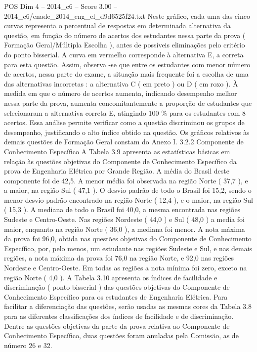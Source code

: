 \begin{textsample}{POS Dim 4 – 2014\_c6 – Score 3.00 – 2014\_c6/enade\_2014\_eng\_el\_d9d6525f24.txt}
Neste gráfico, cada uma das cinco curvas representa o percentual de respostas em determinada alternativa da questão, em função do número de acertos dos estudantes nessa parte da prova ( Formação Geral/Múltipla Escolha ), antes de possíveis eliminações pelo critério do ponto bisserial.
A curva em vermelho corresponde à alternativa E, a correta para esta questão.
Assim, observa -se que entre os estudantes com menor número de acertos, nessa parte do exame, a situação mais frequente foi a escolha de uma das alternativas incorretas : a alternativa C ( em preto ) ou D ( em roxo ).
À medida em que o número de acertos aumenta, indicando desempenho melhor nessa parte da prova, aumenta concomitantemente a proporção de estudantes que selecionaram a alternativa correta E, atingindo 100 \% para os estudantes com 8 acertos.
Essa análise permite verificar como a questão discriminou os grupos de desempenho, justificando o alto índice obtido na questão.
Os gráficos relativos às demais questões de Formação Geral constam do Anexo I. 3.2.2 Componente de Conhecimento Específico A Tabela 3.9 apresenta as estatísticas básicas em relação às questões objetivas do Componente de Conhecimento Específico da prova de Engenharia Elétrica por Grande Região.
A média do Brasil deste componente foi de 42,5.
A menor média foi observada na região Norte ( 37,7 ), e a maior, na região Sul ( 47,1 ).
O desvio padrão de todo o Brasil foi 15,2, sendo o menor desvio padrão encontrado na região Norte ( 12,4 ), e o maior, na região Sul ( 15,3 ).
A mediana de todo o Brasil foi 40,0, a mesma encontrada nas regiões Sudeste e Centro-Oeste.
Nas regiões Nordeste ( 44,0 ) e Sul ( 48,0 ) a media foi maior, enquanto na região Norte ( 36,0 ), a mediana foi menor.
A nota máxima da prova foi 96,0, obtida nas questões objetivas do Componente de Conhecimento Específico, por, pelo menos, um estudante nas regiões Sudeste e Sul, e nas demais regiões, a nota máxima da prova foi 76,0 na região Norte, e 92,0 nas regiões Nordeste e Centro-Oeste.
Em todas as regiões a nota mínima foi zero, exceto na região Norte ( 4,0 ).
A Tabela 3.10 apresenta os índices de facilidade e discriminação ( ponto bisserial ) das questões objetivas do Componente de Conhecimento Específico para os estudantes de Engenharia Elétrica.
Para facilitar a diferenciação das questões, serão usadas as mesmas cores da Tabela 3.8 para as diferentes classificações dos índices de facilidade e de discriminação.
Dentre as questões objetivas da parte da prova relativa ao Componente de Conhecimento Específico, duas questões foram anuladas pela Comissão, as de número 26 e 32.

\end{textsample}
